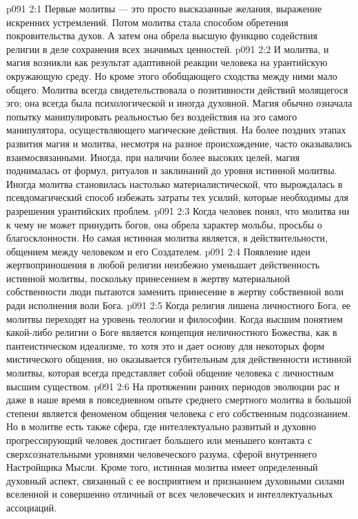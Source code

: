 \vs p091 2:1 Первые молитвы --- это просто высказанные желания, выражение искренних устремлений. Потом молитва стала способом обретения покровительства духов. А затем она обрела высшую функцию содействия религии в деле сохранения всех значимых ценностей.
\vs p091 2:2 И молитва, и магия возникли как результат адаптивной реакции человека на урантийскую окружающую среду. Но кроме этого обобщающего сходства между ними мало общего. Молитва всегда свидетельствовала о позитивности действий молящегося эго; она всегда была психологической и иногда духовной. Магия обычно означала попытку манипулировать реальностью без воздействия на эго самого манипулятора, осуществляющего магические действия. На более поздних этапах развития магия и молитва, несмотря на разное происхождение, часто оказывались взаимосвязанными. Иногда, при наличии более высоких целей, магия поднималась от формул, ритуалов и заклинаний до уровня истинной молитвы. Иногда молитва становилась настолько материалистической, что вырождалась в псевдомагический способ избежать затраты тех усилий, которые необходимы для разрешения урантийских проблем.
\vs p091 2:3 \pc Когда человек понял, что молитва ни к чему не может принудить богов, она обрела характер мольбы, просьбы о благосклонности. Но самая истинная молитва является, в действительности, общением между человеком и его Создателем.
\vs p091 2:4 \pc Появление идеи жертвоприношения в любой религии неизбежно уменьшает действенность истинной молитвы, поскольку принесением в жертву материальной собственности люди пытаются заменить принесение в жертву собственной воли ради исполнения воли Бога.
\vs p091 2:5 Когда религия лишена личностного Бога, ее молитвы переходят на уровень теологии и философии. Когда высшим понятием какой\hyp{}либо религии о Боге является концепция неличностного Божества, как в пантеистическом идеализме, то хотя это и дает основу для некоторых форм мистического общения, но оказывается губительным для действенности истинной молитвы, которая всегда представляет собой общение человека с личностным высшим существом.
\vs p091 2:6 На протяжении ранних периодов эволюции рас и даже в наше время в повседневном опыте среднего смертного молитва в большой степени является феноменом общения человека с его собственным подсознанием. Но в молитве есть также сфера, где интеллектуально развитый и духовно прогрессирующий человек достигает большего или меньшего контакта с сверхсознательными уровнями человеческого разума, сферой внутреннего Настройщика Мысли. Кроме того, истинная молитва имеет определенный духовный аспект, связанный с ее восприятием и признанием духовными силами вселенной и совершенно отличный от всех человеческих и интеллектуальных ассоциаций.
